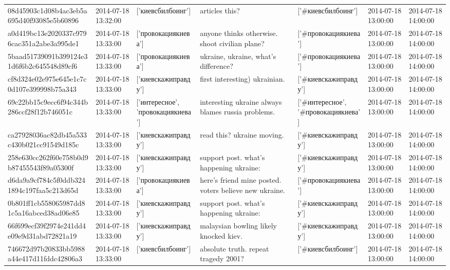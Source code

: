 \begin{tabular}{lllllll}
08d45903c1d08b4ac3eb5a695d40f93085e5b60896 & 2014-07-18 13:32:00 & ['киевсбилбоинг'] & articles this? & ['#киевсбилбоинг'] & 2014-07-18 13:00:00 & 2014-07-18 14:00:00 \\
a0d419bc13e2020337c9796cac351a2abe3a995de1 & 2014-07-18 13:33:00 & ['провокациякиева'] & anyone thinks otherwise. shoot civilian plane? & ['#провокациякиева'] & 2014-07-18 13:00:00 & 2014-07-18 14:00:00 \\
5baad51739091b399124e31d6f6b2c645548d89cf6 & 2014-07-18 13:33:00 & ['провокациякиева'] & ukraine, ukraine, what's difference? & ['#провокациякиева'] & 2014-07-18 13:00:00 & 2014-07-18 14:00:00 \\
cf8d324e02e975e645e1c7c0d107e399998b75a343 & 2014-07-18 13:33:00 & ['киевскажиправду'] & first interesting) ukrainian. & ['#киевскажиправду'] & 2014-07-18 13:00:00 & 2014-07-18 14:00:00 \\
69c22bb15c9ecc6f94c344b286ccf28f12b746051c & 2014-07-18 13:33:00 & ['интересное', 'провокациякиева'] & interesting ukraine always blames russia problems. & ['#интересное', '#провокациякиева'] & 2014-07-18 13:00:00 & 2014-07-18 14:00:00 \\
ca27928036ac82db45a533c430b021cc91549d185c & 2014-07-18 13:33:00 & ['киевскажиправду'] & read this? ukraine moving. & ['#киевскажиправду'] & 2014-07-18 13:00:00 & 2014-07-18 14:00:00 \\
258e630cc262f60e758b0d9b87455543f89a05300f & 2014-07-18 13:33:00 & ['киевскажиправду'] & support post. what's happening ukraine: & ['#киевскажиправду'] & 2014-07-18 13:00:00 & 2014-07-18 14:00:00 \\
d6da9a9cf784c5f0ddb3241894c197faa5c213d65d & 2014-07-18 13:33:00 & ['провокациякиева'] & here's friend mine posted. voters believe new ukraine. & ['#провокациякиева'] & 2014-07-18 13:00:00 & 2014-07-18 14:00:00 \\
0b801ff1cb558065987dd81c5a16abced38ad06e85 & 2014-07-18 13:33:00 & ['киевскажиправду'] & support post. what's happening ukraine: & ['#киевскажиправду'] & 2014-07-18 13:00:00 & 2014-07-18 14:00:00 \\
66f699ecf39f2974e241dd4e09e9d31abd72821a19 & 2014-07-18 13:33:00 & ['киевскажиправду'] & malaysian bowling likely knocked kiev. & ['#киевскажиправду'] & 2014-07-18 13:00:00 & 2014-07-18 14:00:00 \\
746672d97b20833bb5988a44e417d11fddc42806a3 & 2014-07-18 13:33:00 & ['киевсбилбоинг'] & absolute truth. repeat tragedy 2001? & ['#киевсбилбоинг'] & 2014-07-18 13:00:00 & 2014-07-18 14:00:00 \\

\end{tabular}
